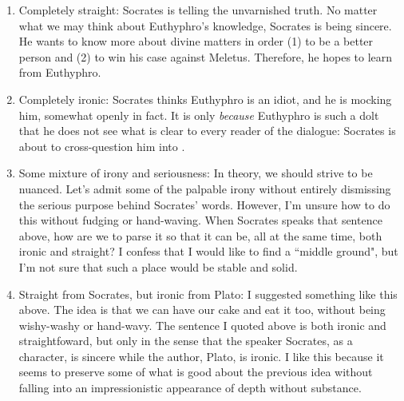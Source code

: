 \documentclass[11pt]{article}
\begin{document}
\begin{enumerate}
    \item Completely straight: Socrates is telling the unvarnished truth.  No matter what we may think about Euthyphro's knowledge, Socrates is being sincere. He wants to know more about divine matters in order (1) to be a better person and (2) to win his case against Meletus. Therefore, he hopes to learn from Euthyphro.
    \item Completely ironic: Socrates thinks Euthyphro is an idiot, and he is mocking him, somewhat openly in fact.  It is only \emph{because} Euthyphro is such a dolt that he does not see what is clear to every reader of the dialogue: Socrates is about to cross-question him into .
    \item Some mixture of irony and seriousness: In theory, we should strive to be nuanced. Let's admit some of the palpable irony without entirely dismissing the serious purpose behind Socrates' words.  However, I'm unsure how to do this without fudging or hand-waving.  When Socrates speaks that sentence above, how are we to parse it so that it can be, all at the same time, both ironic and straight?  I confess that I would like to find a ``middle ground", but I'm not sure that such a place would be stable and solid.
    \item Straight from Socrates, but ironic from Plato: I suggested something like this above. The idea is that we can have our cake and eat it too, without being wishy-washy or hand-wavy.  The sentence I quoted above is both ironic and straightfoward, but only in the sense that the speaker Socrates, as a character, is sincere while the author, Plato, is ironic.  I like this because it seems to preserve some of what is good about the previous idea without falling into an impressionistic appearance of depth without substance.
\end{enumerate}


\newpage


\end{document}
